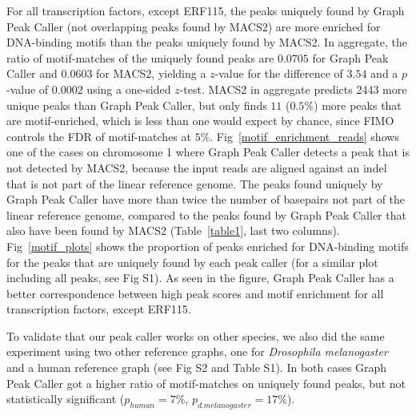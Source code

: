 \documentclass[10pt,letterpaper]{article}
\begin{document}
For all transcription factors, except ERF115, the peaks uniquely found by Graph Peak Caller (not overlapping peaks found by MACS2) are more enriched for DNA-binding motifs than the peaks uniquely found by MACS2. In aggregate, the ratio of motif-matches of the uniquely found peaks are $0.0705$ for Graph Peak Caller and $0.0603$ for MACS2, yielding a $z$-value for the difference of $3.54$ and a $p$-value of $0.0002$ using a one-sided $z$-test. MACS2 in aggregate predicts 2443 more unique peaks than Graph Peak Caller, but only finds $11$ ($0.5\%$) more peaks that are motif-enriched, which is less than one would expect by chance, since FIMO controls the FDR of motif-matches at $5\%$. Fig~\ref{motif_enrichment_reads} shows one of the cases on chromosome 1 where Graph Peak Caller detects a peak that is not detected by MACS2, because the input reads are aligned against an indel that is not part of the linear reference genome. The peaks found uniquely by Graph Peak Caller have more than twice the number of basepairs not part of the linear reference genome, compared to the peaks found by Graph Peak Caller that also have been found by MACS2 (Table~\ref{table1}, last two columns). Fig~\ref{motif_plots} shows the proportion of peaks enriched for DNA-binding motifs for the peaks that are uniquely found by each peak caller (for a similar plot including all peaks, see Fig S1). As seen in the figure, Graph Peak Caller has a better correspondence between high peak scores and motif enrichment for all transcription factors, except ERF115. 

To validate that our peak caller works on other species, we also did the same experiment using two other reference graphs, one for \emph{Drosophila melanogaster } and a human reference graph (see Fig S2 and Table S1). In both cases Graph Peak Caller got a higher ratio of motif-matches on uniquely found peaks, but not statistically significant ($p_{human}=7\%$, $p_{d.melanogaster}=17\%$).
\end{document}
